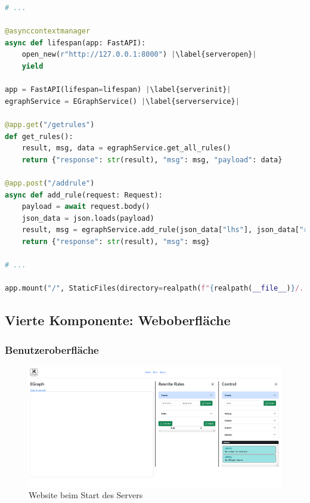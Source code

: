 \begin{lstlisting}[language=Python, escapechar=|, caption=Auszug aus der Datei \textit{server.py}, label={lst:server}]
# ... 

@asynccontextmanager
async def lifespan(app: FastAPI):
    open_new(r"http://127.0.0.1:8000") |\label{serveropen}|
    yield

app = FastAPI(lifespan=lifespan) |\label{serverinit}|
egraphService = EGraphService() |\label{serverservice}|

@app.get("/getrules")
def get_rules():
    result, msg, data = egraphService.get_all_rules()
    return {"response": str(result), "msg": msg, "payload": data}

@app.post("/addrule")
async def add_rule(request: Request):
    payload = await request.body()
    json_data = json.loads(payload)
    result, msg = egraphService.add_rule(json_data["lhs"], json_data["rhs"])
    return {"response": str(result), "msg": msg}

# ... 

app.mount("/", StaticFiles(directory=realpath(f"{realpath(__file__)}/../static"), html=True), name="static")
\end{lstlisting} 


\subsection{Vierte Komponente: Weboberfläche}


\subsubsection{Benutzeroberfläche}


\newpage
\begin{figure}[H]
\centering
\includegraphics[scale=0.42, angle=90]{../fig/website.png}
\caption{Website beim Start des Servers}
\label{fig:website}
\end{figure}
\newpage


